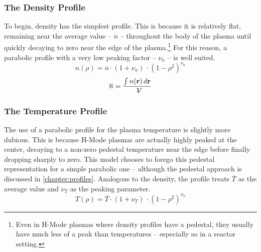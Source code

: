 \subsubsection{The Density Profile}

To begin, density has the simplest profile. This is because it is relatively flat, remaining near the average value -- $\overline n$ -- throughout the body of the plasma until quickly decaying to zero near the edge of the plasma.\footnote{Even in H-Mode plasmas where density profiles have a pedestal,\cite{density} they usually have much less of a peak than temperatures\cite{temperature} -- especially so in a reactor setting.\cite{pedestals}} For this reason, a parabolic profile with a very low peaking factor -- $\nu_n$ -- is well suited.
\begin{equation}
	n(\rho) = \overline n \cdot ( 1 + \nu_n ) \, \cdot ( 1 - \rho ^ 2 ) ^ {\nu_n}
\end{equation}
\begin{equation}
	\overline n = \frac{ \int n(\vec{\bold{r}}) \, d\vec{\bold{r}}  }{\volume}
\end{equation}

\subsubsection{The Temperature Profile}

The use of a parabolic profile for the plasma temperature is slightly more dubious. This is because H-Mode plasmas are actually highly peaked at the center, decaying to a non-zero pedestal temperature near the edge before finally dropping sharply to zero. This model chooses to forego this pedestal representation for a simple parabolic one -- although the pedestal approach is discussed in \cref{chapter:profiles}. Analogous to the density, the profile treats $\overline T$ as the average value and $\nu_T$ as the peaking parameter.
\begin{equation}
	T(\rho) = \overline T \cdot ( 1 + \nu_T ) \, \cdot ( 1 - \rho ^ 2 ) ^ {\nu_T}
\end{equation}

